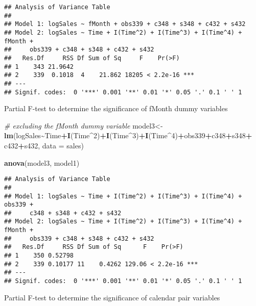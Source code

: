 \documentclass[
]{article}
\newenvironment{Shaded}{\begin{snugshade}}{\end{snugshade}}
\newcommand{\AttributeTok}[1]{\textcolor[rgb]{0.13,0.29,0.53}{#1}}
\newcommand{\CommentTok}[1]{\textcolor[rgb]{0.56,0.35,0.01}{\textit{#1}}}
\newcommand{\DecValTok}[1]{\textcolor[rgb]{0.00,0.00,0.81}{#1}}
\newcommand{\FunctionTok}[1]{\textcolor[rgb]{0.13,0.29,0.53}{\textbf{#1}}}
\newcommand{\NormalTok}[1]{#1}
\newcommand{\OtherTok}[1]{\textcolor[rgb]{0.56,0.35,0.01}{#1}}
\newcommand{\SpecialCharTok}[1]{\textcolor[rgb]{0.81,0.36,0.00}{\textbf{#1}}}
\begin{document}
\begin{verbatim}
## Analysis of Variance Table
## 
## Model 1: logSales ~ fMonth + obs339 + c348 + s348 + c432 + s432
## Model 2: logSales ~ Time + I(Time^2) + I(Time^3) + I(Time^4) + fMonth + 
##     obs339 + c348 + s348 + c432 + s432
##   Res.Df     RSS Df Sum of Sq     F    Pr(>F)    
## 1    343 21.9642                                 
## 2    339  0.1018  4    21.862 18205 < 2.2e-16 ***
## ---
## Signif. codes:  0 '***' 0.001 '**' 0.01 '*' 0.05 '.' 0.1 ' ' 1
\end{verbatim}

Partial F-test to determine the significance of fMonth dummy variables

\begin{Shaded}
\begin{Highlighting}[]
\CommentTok{\# excluding the fMonth dummy variable}
\NormalTok{model3}\OtherTok{\textless{}{-}}\FunctionTok{lm}\NormalTok{(logSales}\SpecialCharTok{\textasciitilde{}}\NormalTok{Time}\SpecialCharTok{+}\FunctionTok{I}\NormalTok{(Time}\SpecialCharTok{\^{}}\DecValTok{2}\NormalTok{)}\SpecialCharTok{+}\FunctionTok{I}\NormalTok{(Time}\SpecialCharTok{\^{}}\DecValTok{3}\NormalTok{)}\SpecialCharTok{+}\FunctionTok{I}\NormalTok{(Time}\SpecialCharTok{\^{}}\DecValTok{4}\NormalTok{)}\SpecialCharTok{+}\NormalTok{obs339}\SpecialCharTok{+}\NormalTok{c348}\SpecialCharTok{+}\NormalTok{s348}\SpecialCharTok{+}
\NormalTok{c432}\SpecialCharTok{+}\NormalTok{s432, }\AttributeTok{data =}\NormalTok{ sales)}

\FunctionTok{anova}\NormalTok{(model3, model1)}
\end{Highlighting}
\end{Shaded}

\begin{verbatim}
## Analysis of Variance Table
## 
## Model 1: logSales ~ Time + I(Time^2) + I(Time^3) + I(Time^4) + obs339 + 
##     c348 + s348 + c432 + s432
## Model 2: logSales ~ Time + I(Time^2) + I(Time^3) + I(Time^4) + fMonth + 
##     obs339 + c348 + s348 + c432 + s432
##   Res.Df     RSS Df Sum of Sq      F    Pr(>F)    
## 1    350 0.52798                                  
## 2    339 0.10177 11    0.4262 129.06 < 2.2e-16 ***
## ---
## Signif. codes:  0 '***' 0.001 '**' 0.01 '*' 0.05 '.' 0.1 ' ' 1
\end{verbatim}

Partial F-test to determine the significance of calendar pair variables
\end{document}
